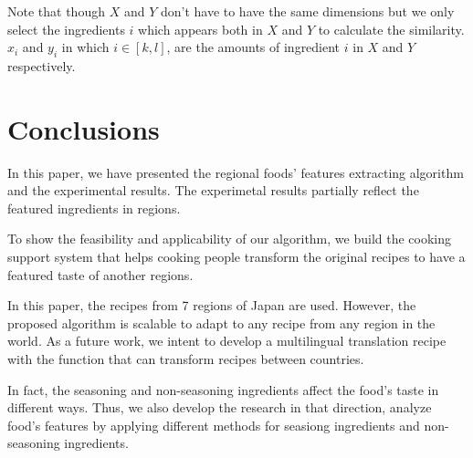 \documentclass{sig-alternate}
\begin{document}
Note that though $X$ and $Y$ don't have to have the same dimensions but we only select the ingredients $i$ which appears both in $X$ and $Y$ to calculate the similarity. $x_i$ and $y_i$ in which $i \in [k,l]$, are the amounts of ingredient $i$ in $X$ and $Y$ respectively.

\section{Conclusions}

In this paper, we have presented the regional foods' features extracting algorithm and the experimental results. The experimetal results partially reflect the featured ingredients in regions. 

To show the feasibility and applicability of our algorithm, we build the cooking support system that helps cooking people transform the original recipes to have a featured taste of another regions.  

In this paper, the recipes from 7 regions of Japan are used. However, the proposed algorithm is scalable to adapt to any recipe from any region in the world. As a future work, we intent to develop a multilingual translation recipe with the function that can transform recipes between countries. 

In fact, the seasoning and non-seasoning ingredients affect the food's taste in different ways. Thus, we also develop the research in that direction, analyze food's features by applying different methods for seasiong ingredients and non-seasoning ingredients.



\end{document}
